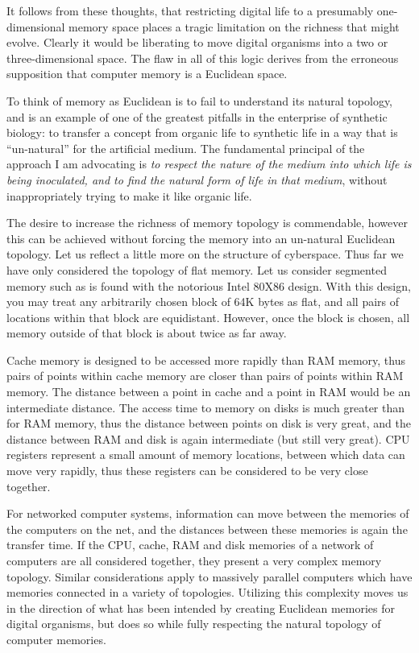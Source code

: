It follows from these thoughts, that restricting digital life to a
presumably one-dimensional memory space places a tragic limitation on
the richness that might evolve.  Clearly it would be liberating to
move digital organisms into a two or three-dimensional space.  The flaw
in all of this logic derives from the erroneous supposition that
computer memory is a Euclidean space.

To think of memory as Euclidean is to fail to understand its natural
topology, and is an example of one of the greatest pitfalls in the
enterprise of synthetic biology: to transfer a concept from organic
life to synthetic life in a way that is ``un-natural'' for the artificial
medium.  The fundamental principal of the approach I am advocating
is {\it to respect the nature of the medium into which life is being
inoculated, and to find the natural form of life in that medium},
without inappropriately trying to make it like organic life.

The desire to increase the richness of memory topology is commendable,
however this can be achieved without forcing the memory into an
un-natural Euclidean topology.  Let us reflect a little more on the
structure of cyberspace.  Thus far we have only considered the topology
of flat memory.  Let us consider segmented memory such as is found with
the notorious Intel 80X86 design.  With this design, you may treat any
arbitrarily chosen block of 64K bytes as flat, and all pairs of locations
within that block are equidistant.  However, once the block is chosen,
all memory outside of that block is about twice as far away.

Cache memory is designed to be accessed more rapidly than RAM memory,
thus pairs of points within cache memory are closer than pairs of points
within RAM memory.  The distance between a point in cache and a point in
RAM would be an intermediate distance.  The access time to memory on
disks is much greater than for RAM memory, thus the distance between
points on disk is very great, and the distance between RAM and disk is
again intermediate (but still very great).  CPU registers represent a small
amount of memory locations, between which data can move very rapidly,
thus these registers can be considered to be very close together.

For networked computer systems, information can move between the memories
of the computers on the net, and the distances between these memories is
again the transfer time.  If the CPU, cache, RAM and disk memories of a
network of computers are all considered together, they present a very
complex memory topology.  Similar considerations apply to massively
parallel computers which have memories connected in a variety of
topologies.  Utilizing this complexity moves us in the direction of what
has been intended by creating Euclidean memories for digital organisms,
but does so while fully respecting the natural topology of computer
memories.

